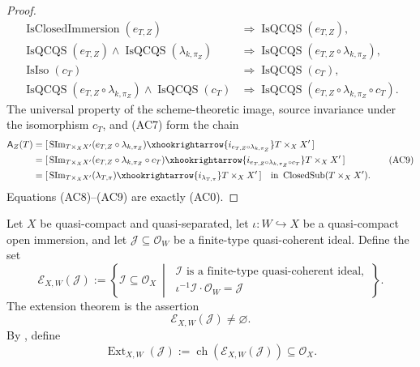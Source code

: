 \begin{proof}
  \[
  \begin{aligned}
    \operatorname{IsClosedImmersion}(e_{T,Z})
      &\Longrightarrow\operatorname{IsQCQS}(e_{T,Z}),\\
    \operatorname{IsQCQS}(e_{T,Z})\wedge
      \operatorname{IsQCQS}(\lambda_{k,\pi_Z})
      &\Longrightarrow
        \operatorname{IsQCQS}(e_{T,Z}\circ\lambda_{k,\pi_Z}),\\
    \operatorname{IsIso}(c_T)
      &\Longrightarrow\operatorname{IsQCQS}(c_T),\\
    \operatorname{IsQCQS}(e_{T,Z}\circ\lambda_{k,\pi_Z})\wedge
      \operatorname{IsQCQS}(c_T)
      &\Longrightarrow
        \operatorname{IsQCQS}
          (e_{T,Z}\circ\lambda_{k,\pi_Z}\circ c_T).
  \end{aligned}                                                     \tag{AC8a}
  \]
  The universal property of the scheme-theoretic image,
  source invariance under the isomorphism $c_T$, and (AC7) form the chain
  \[
  \begin{aligned}
    \mathsf A_Z(T)
      &=[\,\operatorname{SIm}_{T\times_XX'}
          (e_{T,Z}\circ\lambda_{k,\pi_Z})
        \xhookrightarrow{i_{e_{T,Z}\circ\lambda_{k,\pi_Z}}}
          T\times_XX'\,]\\
      &=[\,\operatorname{SIm}_{T\times_XX'}
          (e_{T,Z}\circ\lambda_{k,\pi_Z}\circ c_T)
        \xhookrightarrow{i_{e_{T,Z}\circ\lambda_{k,\pi_Z}\circ c_T}}
          T\times_XX'\,]\\
      &=[\,\operatorname{SIm}_{T\times_XX'}(\lambda_{T,\pi})
        \xhookrightarrow{i_{\lambda_{T,\pi}}}T\times_XX'\,]
      \quad\text{in }\operatorname{ClosedSub}(T\times_XX').
  \end{aligned}                                                   \tag{AC9}
  \]
  Equations (AC8)--(AC9) are exactly (AC0).
\end{proof}

\begin{definition}
  \label{def:nagata-finite-type-ideal-extension}
  \lean{}

  Let $X$ be quasi-compact and quasi-separated, let
  $\iota\colon W\hookrightarrow X$ be a quasi-compact open immersion, and let
  $\mathcal J\subseteq\mathcal O_W$ be a finite-type quasi-coherent ideal.
  Define the set
  \[
    \mathscr E_{X,W}(\mathcal J)
      :=\left\{
        \mathcal I\subseteq\mathcal O_X\
        \middle|\
        \begin{array}{l}
          \mathcal I\text{ is a finite-type quasi-coherent ideal},\\
          \iota^{-1}\mathcal I\cdot\mathcal O_W=\mathcal J
        \end{array}\right\}.
  \]
  The extension theorem
  \cite[\href{https://stacks.math.columbia.edu/tag/01PF}{Tag 01PF}]
    {stacks-project} is the assertion
  \[
    \mathscr E_{X,W}(\mathcal J)\neq\varnothing.
  \]
  By , define
  \[
    \operatorname{Ext}_{X,W}(\mathcal J)
      :=\operatorname{ch}(\mathscr E_{X,W}(\mathcal J))
      \subseteq\mathcal O_X.
  \]
\end{definition}


